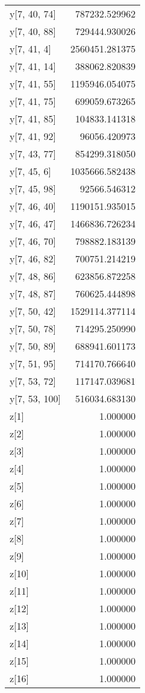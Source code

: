 \begin{longtable}{lr}
y[7, 40, 74] & 787232.529962 \\
y[7, 40, 88] & 729444.930026 \\
y[7, 41, 4] & 2560451.281375 \\
y[7, 41, 14] & 388062.820839 \\
y[7, 41, 55] & 1195946.054075 \\
y[7, 41, 75] & 699059.673265 \\
y[7, 41, 85] & 104833.141318 \\
y[7, 41, 92] & 96056.420973 \\
y[7, 43, 77] & 854299.318050 \\
y[7, 45, 6] & 1035666.582438 \\
y[7, 45, 98] & 92566.546312 \\
y[7, 46, 40] & 1190151.935015 \\
y[7, 46, 47] & 1466836.726234 \\
y[7, 46, 70] & 798882.183139 \\
y[7, 46, 82] & 700751.214219 \\
y[7, 48, 86] & 623856.872258 \\
y[7, 48, 87] & 760625.444898 \\
y[7, 50, 42] & 1529114.377114 \\
y[7, 50, 78] & 714295.250990 \\
y[7, 50, 89] & 688941.601173 \\
y[7, 51, 95] & 714170.766640 \\
y[7, 53, 72] & 117147.039681 \\
y[7, 53, 100] & 516034.683130 \\
z[1] & 1.000000 \\
z[2] & 1.000000 \\
z[3] & 1.000000 \\
z[4] & 1.000000 \\
z[5] & 1.000000 \\
z[6] & 1.000000 \\
z[7] & 1.000000 \\
z[8] & 1.000000 \\
z[9] & 1.000000 \\
z[10] & 1.000000 \\
z[11] & 1.000000 \\
z[12] & 1.000000 \\
z[13] & 1.000000 \\
z[14] & 1.000000 \\
z[15] & 1.000000 \\
z[16] & 1.000000 \\

\end{longtable}
